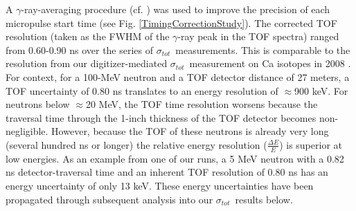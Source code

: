 \documentclass[twocolumn,secnumarabic,amssymb, nobibnotes, aps, prl,
superscriptaddress, nobalancelastpage, draft]{revtex4}
\newcommand{\tot}{\ensuremath{\sigma_{tot}}}
\begin{document}
A $\gamma$-ray-averaging procedure (cf. \cite{Shane2010}) was
used to improve the precision of each micropulse start time (see Fig.
\ref{TimingCorrectionStudy}). The corrected TOF resolution (taken
as the FWHM of the $\gamma$-ray peak in the TOF spectra) ranged from
0.60-0.90 ns over the series of \tot\ measurements.
This is comparable to the resolution from 
our digitizer-mediated \tot\ measurement on Ca isotopes in 2008 \cite{Shane2010}.
For context, for a 100-MeV neutron and a TOF detector distance of 27 meters, a TOF 
uncertainty of 0.80 ns translates to an energy resolution of $\approx$900 keV.
For neutrons below $\approx$20 MeV, the TOF time resolution worsens because the traversal time 
through the 1-inch thickness of the TOF detector becomes non-negligible.
However, because the TOF of these neutrons is already very long (several hundred ns or
longer) the relative energy resolution ($\frac{\Delta E}{E}$) is
superior at low energies. As an example from one of our runs, a 5 MeV neutron with
a 0.82 ns detector-traversal time and an inherent TOF resolution of 0.80 ns
has an energy uncertainty of only 13 keV. These energy uncertainties
have been propagated through subsequent analysis into our \tot\ results below.
\end{document}
